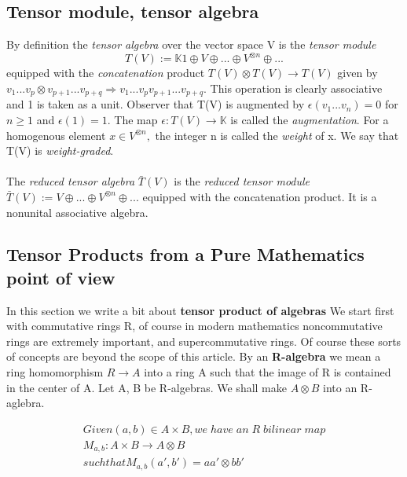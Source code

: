 \documentclass[preprint, 5p, 10pt]{elsarticle}
\theoremstyle{plain}
\begin{document}
\subsection{Tensor module, tensor algebra}
By definition the \textit{tensor algebra} over the vector space V is the \textit{tensor module}
\begin{equation}
  T(V):=\mathbb{K}1\oplus V \oplus ... \oplus V^{\otimes n} \oplus ...
 \end{equation}
equipped with the \textit{concatenation} product $T(V)\otimes T(V) \rightarrow T(V)$ given by
$v_{1}...v_{p}\otimes v_{p+1} ... v_{p+q} \Rightarrow v_{1}...v_{p}v_{p+1}...v_{p+q}.$
This operation is clearly associative and 1 is taken as a unit. Observer that T(V) is augmented by $\epsilon
(v_{1}...v_{n}) = 0$ for $n \geq 1$ and $\epsilon(1) = 1$.
The map $\epsilon: T(V) \rightarrow \mathbb{K}$ is called the \textit{augmentation}. For a homogenous
element $x \in V^{\otimes n},$ the integer n is called the \textit{weight} of x. We say that T(V) is 
\textit{weight-graded}. 
\paragraph{} The \textit{reduced tensor algebra} $\bar{T}(V)$ is the \textit{reduced tensor module} 
$\bar{T}(V):=V \oplus ... \oplus V^{\otimes n} \oplus ...$
equipped with the concatenation product. It is a nonunital associative algebra. 
\subsection{Tensor Products from a Pure Mathematics point of view}
In this section we write a bit about \textbf{tensor product of algebras}\cite{Lang,Yokonuma1992}
We start first with commutative rings R, of course in modern mathematics noncommutative rings are 
extremely important, and supercommutative rings. Of course these sorts of concepts are beyond
the scope of this article. 
By an \textbf{R-algebra} we mean a ring homomorphism $R \rightarrow A$ into a ring A such that the image
of R is contained in the center of A.
Let A, B be R-algebras. We shall make $A \otimes B$ into an R-aglebra. 

\begin{align}
 Given (a,b) \in A\times B, we\;have\; an\; R\; bilinear\; map
\\ M_{a,b}: A \times B \rightarrow A \otimes B 
\\ such that M_{a,b}(a',b') = aa' \otimes bb'
\end{align}
\end{document}
